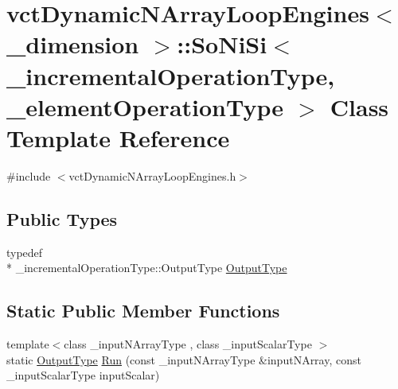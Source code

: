 \hypertarget{classvct_dynamic_n_array_loop_engines_1_1_so_ni_si}{\section{vct\-Dynamic\-N\-Array\-Loop\-Engines$<$ \-\_\-dimension $>$\-:\-:So\-Ni\-Si$<$ \-\_\-incremental\-Operation\-Type, \-\_\-element\-Operation\-Type $>$ Class Template Reference}
\label{classvct_dynamic_n_array_loop_engines_1_1_so_ni_si}
}


{\ttfamily \#include $<$vct\-Dynamic\-N\-Array\-Loop\-Engines.\-h$>$}

\subsection*{Public Types}
\begin{DoxyCompactItemize}
\item 
typedef \\*
\-\_\-incremental\-Operation\-Type\-::\-Output\-Type \hyperlink{classvct_dynamic_n_array_loop_engines_1_1_so_ni_si_a6ccca4bbd5b212028da2432d517baa2d}{Output\-Type}
\end{DoxyCompactItemize}
\subsection*{Static Public Member Functions}
\begin{DoxyCompactItemize}
\item 
{\footnotesize template$<$class \-\_\-input\-N\-Array\-Type , class \-\_\-input\-Scalar\-Type $>$ }\\static \hyperlink{classvct_dynamic_n_array_loop_engines_1_1_so_ni_si_a6ccca4bbd5b212028da2432d517baa2d}{Output\-Type} \hyperlink{classvct_dynamic_n_array_loop_engines_1_1_so_ni_si_a3ae2384c2a48634260ad3d706d2ac4d8}{Run} (const \-\_\-input\-N\-Array\-Type \&input\-N\-Array, const \-\_\-input\-Scalar\-Type input\-Scalar)
\end{DoxyCompactItemize}


